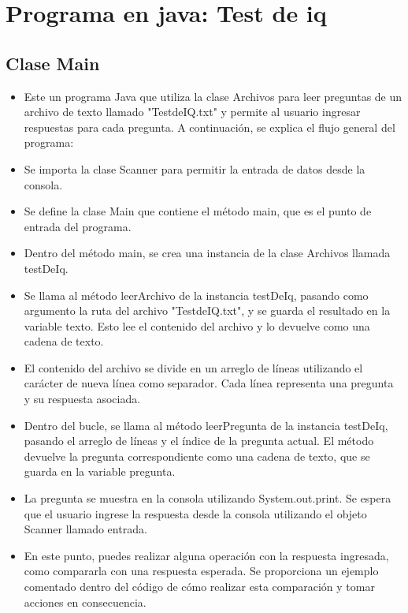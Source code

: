 \documentclass{article}
\begin{document}
	\section{Programa en java: Test de iq}

	\subsection{Clase Main}
	\begin{itemize}	
		\item Este un programa Java que utiliza la clase Archivos para leer preguntas de un archivo de texto llamado "TestdeIQ.txt" y permite al usuario ingresar respuestas para cada pregunta. A continuación, se explica el flujo general del programa:
	\end{itemize}	
	
		

	\begin{itemize}	
		\item Se importa la clase Scanner para permitir la entrada de datos desde la consola.
		\item Se define la clase Main que contiene el método main, que es el punto de entrada del programa.
		\item Dentro del método main, se crea una instancia de la clase Archivos llamada testDeIq.
		\item Se llama al método leerArchivo de la instancia testDeIq, pasando como argumento la ruta del archivo "TestdeIQ.txt", y se guarda el resultado en la variable texto. Esto lee el contenido del archivo y lo devuelve como una cadena de texto.
		\item El contenido del archivo se divide en un arreglo de líneas utilizando el carácter de nueva línea como separador. Cada línea representa una pregunta y su respuesta asociada.
		\item Dentro del bucle, se llama al método leerPregunta de la instancia testDeIq, pasando el arreglo de líneas y el índice de la pregunta actual. El método devuelve la pregunta correspondiente como una cadena de texto, que se guarda en la variable pregunta.
		\item La pregunta se muestra en la consola utilizando System.out.print.
		Se espera que el usuario ingrese la respuesta desde la consola utilizando el objeto Scanner llamado entrada. 
		\item En este punto, puedes realizar alguna operación con la respuesta ingresada, como compararla con una respuesta esperada. Se proporciona un ejemplo comentado dentro del código de cómo realizar esta comparación y tomar acciones en consecuencia.
	\end{itemize}
\end{document}
